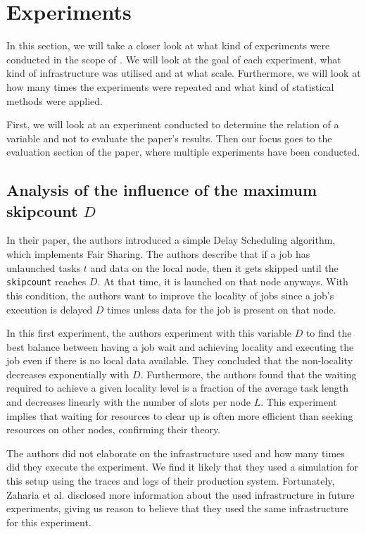 \section{Experiments}

In this section, we will take a closer look at what kind of experiments were conducted in the scope of \cite{ds}. We will look at the goal of each experiment, what kind of infrastructure was utilised and at what scale. Furthermore, we will look at how many times the experiments were repeated and what kind of statistical methods were applied.

First, we will look at an experiment conducted to determine the relation of a variable and not to evaluate the paper's results.
Then our focus goes to the evaluation section of the paper, where multiple experiments have been conducted.

\subsection{Analysis of the influence of the maximum skipcount \textbf{$D$}}

In their paper, the authors introduced a simple Delay Scheduling algorithm, which implements Fair Sharing. The authors describe that if a job has unlaunched tasks $t$ and data on the local node, then it gets skipped until the \texttt{skipcount} reaches $D$. At that time, it is launched on that node anyways. With this condition, the authors want to improve the locality of jobs since a job's execution is delayed $D$ times unless data for the job is present on that node.

In this first experiment, the authors experiment with this variable $D$ to find the best balance between having a job wait and achieving locality and executing the job even if there is no local data available. They concluded that the non-locality decreases exponentially with $D$. Furthermore, the authors found that the waiting required to achieve a given locality level is a fraction of the average task length and decreases linearly with the number of slots per node $L$. This experiment implies that waiting for resources to clear up is often more efficient than seeking resources on other nodes, confirming their theory.

The authors did not elaborate on the infrastructure used and how many times did they execute the experiment. We find it likely that they used a simulation for this setup using the traces and logs of their production system. Fortunately, Zaharia et al. disclosed more information about the used infrastructure in future experiments, giving us reason to believe that they used the same infrastructure for this experiment.

